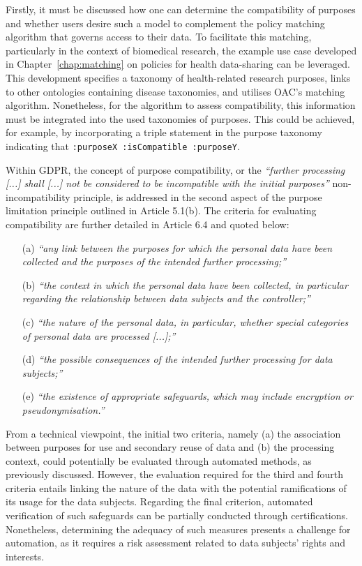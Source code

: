 Firstly, it must be discussed how one can determine the compatibility of purposes and whether users desire such a model to complement the policy matching algorithm that governs access to their data.
To facilitate this matching, particularly in the context of biomedical research, the example use case developed in Chapter~\ref{chap:matching} on policies for health data-sharing can be leveraged.
This development specifies a taxonomy of health-related research purposes, links to other ontologies containing disease taxonomies, and utilises OAC's matching algorithm.
Nonetheless, for the algorithm to assess compatibility, this information must be integrated into the used taxonomies of purposes.
This could be achieved, for example, by incorporating a triple statement in the purpose taxonomy indicating that \texttt{:purposeX :isCompatible :purposeY}.

Within GDPR, the concept of purpose compatibility, or the \textit{``further processing [...] shall [...] not be considered to be incompatible with the initial purposes''} non-incompatibility principle, is addressed in the second aspect of the purpose limitation principle outlined in Article 5.1(b).
The criteria for evaluating compatibility are further detailed in Article 6.4 \citeyearpar{noauthor_regulation_2016} and quoted below:

\begin{enumerate}
    \item [(a)] \textit{``any link between the purposes for which the personal data have been collected and the purposes of the intended further processing;''}
    \item [(b)] \textit{``the context in which the personal data have been collected, in particular regarding the relationship between data subjects and the controller;''}
    \item [(c)] \textit{``the nature of the personal data, in particular, whether special categories of personal data are processed [...];''}
    \item [(d)] \textit{``the possible consequences of the intended further processing for data subjects;''}
    \item [(e)] \textit{``the existence of appropriate safeguards, which may include encryption or pseudonymisation.''}
\end{enumerate}

From a technical viewpoint, the initial two criteria, namely (a) the association between purposes for use and secondary reuse of data and (b) the processing context, could potentially be evaluated through automated methods, as previously discussed.
However, the evaluation required for the third and fourth criteria entails linking the nature of the data with the potential ramifications of its usage for the data subjects.
Regarding the final criterion, automated verification of such safeguards can be partially conducted through certifications.
Nonetheless, determining the adequacy of such measures presents a challenge for automation, as it requires a risk assessment related to data subjects' rights and interests.

